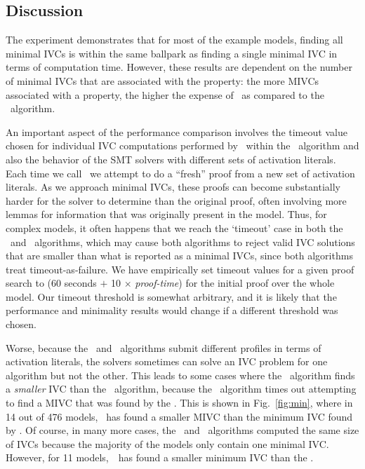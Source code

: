 \subsection {Discussion}
\label{sec:experiment-discussion}
The experiment demonstrates that for most of the example models, finding all minimal IVCs is within the same ballpark as finding a single minimal IVC in terms of computation time.  However, these results are dependent on the number of minimal IVCs that are associated with the property: the more MIVCs associated with a property, the higher the expense of \aivcalg\ as compared to the \ucbfalg\ algorithm.

An important aspect of the performance comparison involves the timeout value chosen for individual IVC computations performed by \getivc\ within the \aivcalg\ algorithm and also the behavior of the SMT solvers with different sets of activation literals.  Each time we call \getivc\ we attempt to do a ``fresh'' proof from a new set of activation literals.  As we approach minimal IVCs, these proofs can become substantially harder for the solver to determine than the original proof, often involving more lemmas for information that was originally present in the model.  Thus, for complex models, it often happens that we reach the `timeout' case in both the \aivcalg\ and \ucbfalg\ algorithms, which may cause both algorithms to reject valid IVC solutions that are smaller than what is reported as a minimal IVCs, since both algorithms treat timeout-as-failure.  We have empirically set timeout values for a given proof search to (60 seconds $+$ 10 $\times$ {\em proof-time}) for the initial proof over the whole model. Our timeout threshold is somewhat arbitrary, and it is likely that the performance and minimality results would change if a different threshold was chosen.

Worse, because the \ucbfalg\ and \aivcalg\ algorithms submit different profiles in terms of activation literals, the solvers sometimes can solve an IVC problem for one algorithm but not the other.  This leads to some cases where the \ucbfalg\ algorithm finds a {\em smaller} IVC than the \aivcalg\ algorithm, because the \aivcalg\ algorithm times out attempting to find a MIVC  that was found by the \ucbfalg.  This is shown in Fig.~\ref{fig:min}, where in 14 out of 476 models, \ucbfalg\ has found a smaller MIVC  than the minimum IVC found by \aivcalg.  Of course, in many more cases, the \aivcalg\ and \ucbfalg\ algorithms computed the same size of IVCs because the majority of the models only contain one minimal IVC. However, for 11 models,~\aivcalg\ has found a smaller minimum IVC than the \ucbfalg .

